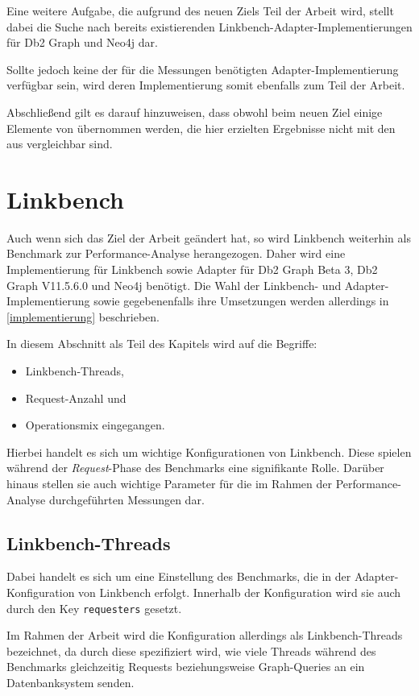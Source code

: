 Eine weitere Aufgabe, die aufgrund des neuen Ziels Teil der Arbeit wird, stellt dabei die Suche nach bereits existierenden Linkbench-Adapter-Implementierungen für Db2 Graph und Neo4j dar. 

Sollte jedoch keine der für die Messungen benötigten Adapter-Implementierung verfügbar sein, wird deren Implementierung somit ebenfalls zum Teil der Arbeit. 

Abschließend gilt es darauf hinzuweisen, dass obwohl beim neuen Ziel einige Elemente von \cite{sigmod_tian} übernommen werden, die hier erzielten Ergebnisse nicht mit den aus \cite{sigmod_tian} vergleichbar sind.

\section{Linkbench}
Auch wenn sich das Ziel der Arbeit geändert hat, so wird Linkbench weiterhin als Benchmark zur Performance-Analyse herangezogen. Daher wird eine Implementierung für Linkbench sowie Adapter für Db2 Graph Beta 3, Db2 Graph V11.5.6.0 und Neo4j benötigt. Die Wahl der Linkbench- und Adapter-Implementierung sowie gegebenenfalls ihre Umsetzungen werden allerdings in \autoref{implementierung} beschrieben. 

In diesem Abschnitt als Teil des Kapitels  wird auf die Begriffe: 
\begin{itemize}
    \item Linkbench-Threads,
    \item Request-Anzahl und
    \item Operationsmix eingegangen.
\end{itemize}
Hierbei handelt es sich um wichtige Konfigurationen von Linkbench. Diese spielen während der \textit{Request}-Phase des Benchmarks eine signifikante Rolle. Darüber hinaus stellen sie auch wichtige Parameter für die im Rahmen der Performance-Analyse durchgeführten Messungen dar. 

\subsection{Linkbench-Threads}
\label{analyse:linkbench:threads}
Dabei handelt es sich um eine Einstellung des Benchmarks, die in der Adapter-Konfiguration von Linkbench erfolgt. Innerhalb der Konfiguration wird sie auch durch den Key \texttt{requesters} gesetzt. 

Im Rahmen der Arbeit wird die Konfiguration allerdings als Linkbench-Threads bezeichnet, da durch diese spezifiziert wird, wie viele Threads während des Benchmarks gleichzeitig Requests beziehungsweise Graph-Queries an ein Datenbanksystem senden.

